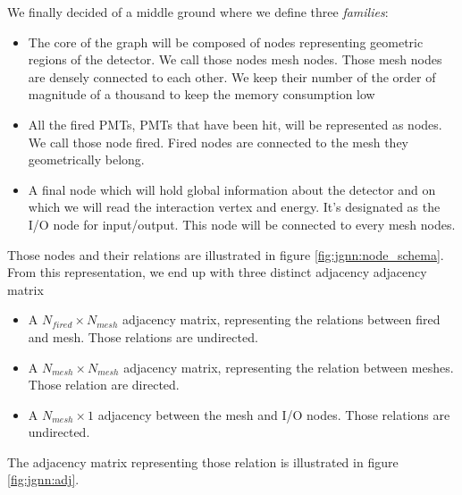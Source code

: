 \documentclass[../main.tex]{subfiles}
\begin{document}
We finally decided of a middle ground where we define three \textit{families}:
\begin{itemize}
  \item The core of the graph will be composed of nodes representing geometric regions of the detector. We call those nodes {\color{Dandelion} mesh} nodes. Those mesh nodes are densely connected to each other. We keep their number of the order of magnitude of a thousand to keep the memory consumption low
  \item All the fired PMTs, PMTs that have been hit, will be represented as nodes. We call those node {\color{red} fired}. Fired nodes are connected to the mesh they geometrically belong.
  \item A final node which will hold global information about the detector and on which we will read the interaction vertex and energy. It's designated as the {\color{blue} I/O} node for input/output. This node will be connected to every mesh nodes.
\end{itemize}
Those nodes and their relations are illustrated in figure \ref{fig:jgnn:node_schema}. From this representation, we end up with three distinct adjacency adjacency matrix
\begin{itemize}
  \item A $N_{fired} \times N_{mesh}$ adjacency matrix, representing the relations between fired and mesh. Those relations are undirected.
  \item A $N_{mesh} \times N_{mesh}$ adjacency matrix, representing the relation between meshes. Those relation are directed.
  \item A $N_{mesh} \times 1$ adjacency between the mesh and I/O nodes. Those relations are undirected.
\end{itemize}
The adjacency matrix representing those relation is illustrated in figure \ref{fig:jgnn:adj}.
\end{document}
